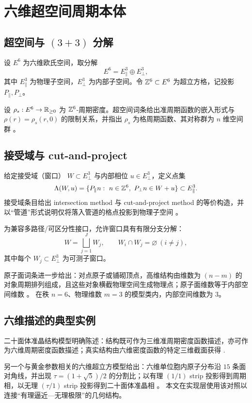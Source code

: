 \section{六维超空间周期本体}

\subsection{\texorpdfstring{超空间与 $(3+3)$ 分解}{超空间与 (3+3) 分解}}

设 $E^{6}$ 为六维欧氏空间，取分解
\[
E^{6}=E_{\parallel}^{3}\oplus E_{\perp}^{3},
\]
其中 $E_{\parallel}^{3}$ 为物理子空间，$E_{\perp}^{3}$ 为内部子空间。令 $\mathbb{Z}^{6}\subset E^{6}$ 为超立方格，记投影 $P_{\parallel},P_{\perp}$。

设 $\rho_s:E^{6}\to\mathbb{R}_{\ge 0}$ 为 $\mathbb{Z}^{6}$-周期密度。超空间词条给出准周期函数的嵌入形式与 $\rho(r)=\rho_s(r,0)$ 的限制关系，并指出 $\rho_s$ 为格周期函数、其对称群为 $n$ 维空间群 \cite{IUCRSuperspace}。

\subsection{接受域与 cut-and-project}

给定接受域（窗口） $W\subset E_{\perp}^{3}$ 与内部相位 $u\in E_{\perp}^{3}$，定义点集
\[
\Lambda(W,u)=\{P_{\parallel}n:\ n\in\ZZ^{6},\ P_{\perp}n\in W+u\}\subset E_{\parallel}^{3}.
\]
接受域条目给出 intersection method 与 cut-and-project method 的等价构造，并以“管道”形式说明仅将落入管道的格点投影到物理子空间 \cite{IUCRAcceptanceDomain}。

为兼容多路径/可区分性接口，允许窗口具有有限分支分解：
\[
W=\bigsqcup_{j=1}^{J} W_j,\qquad W_i\cap W_j=\varnothing\ (i\neq j),
\]
其中每个 $W_j\subset E_{\perp}^{3}$ 为可测子窗口。

原子面词条进一步给出：对点原子或铺砌顶点，高维结构由维数为 $(n-m)$ 的对象周期排列组成，且这些对象横截物理空间生成物理点；原子面维数等于内部空间维数 \cite{IUCRAtomicSurface}。
在秩 $n=6$、物理维数 $m=3$ 的模型类内，内部空间维数为 $3$。

\subsection{六维描述的典型实例}

二十面体准晶结构模型明确陈述：结构既可作为三维准周期密度函数描述，亦可作为六维周期密度函数描述；真实结构由六维密度函数的特定三维截面获得 \cite{PRB43_929}.

另一个与黄金参数相关的六维超立方模型给出：六维单位胞内原子分布沿 $15$ 条面对角线，并出现 $\tau=(1+\sqrt5)/2$ 的分割比；以有理 $(1/1)$ strip 投影得到周期相，以无理 $(\tau/1)$ strip 投影得到二十面体准晶相 \cite{PRB46_6091}。
本文在实现层使用该对照以连接“有理逼近—无理极限”的几何结构。


